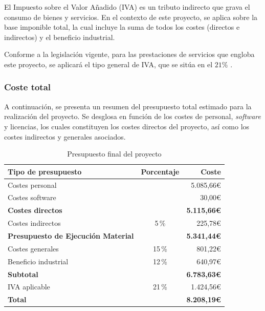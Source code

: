 \documentclass[12pt,a4paper,onecolumn,oneside]{report}
\begin{document}
El Impuesto sobre el Valor Añadido (IVA) es un tributo indirecto que grava el consumo de bienes y servicios. 
En el contexto de este proyecto, se aplica sobre la base imponible total, la cual incluye la suma de todos los costes (directos e indirectos) y el beneficio industrial.

Conforme a la legislación vigente, para las prestaciones de servicios que engloba este proyecto, se aplicará el tipo general de IVA, que se sitúa en el $21\%$ \cite{AEAT_IVA2025}.

\subsubsection{Coste total}
A continuación, se presenta un resumen del presupuesto total estimado para la realización del proyecto. 
Se desglosa en función de los costes de personal, \textit{software} y licencias, los cuales constituyen
los costes directos del proyecto, así como los costes indirectos y generales asociados.

\begin{table}[H]
\caption{Presupuesto final del proyecto}
\centering
\renewcommand{\arraystretch}{1.25}
\begin{tabular}{lcr}
\hline
\textbf{Tipo de presupuesto} & \textbf{Porcentaje} & \textbf{Coste} \\
\hline
Costes personal                 &          & 5.085,66\euro{} \\
Costes software                 &          & 30,00\euro{} \\
\hline
\textbf{Costes directos}       &          & \textbf{5.115,66\euro{}} \\
Costes indirectos     & 5\,\%    & 225,78\euro{} \\
\hline
\textbf{Presupuesto de Ejecución Material} &          & \textbf{5.341,44\euro{}} \\
Costes generales      &  15\,\%  & 801,22\euro{} \\
Beneficio industrial  & 12\,\%   & 640,97\euro{} \\
\hline
\textbf{Subtotal}     &          & \textbf{6.783,63\euro{}} \\
IVA aplicable         & 21\,\%   & 1.424,56\euro{} \\
\hline
\textbf{Total}        &          & \textbf{8.208,19\euro{}} \\
\hline
\end{tabular}
\label{tab:presupuesto_final}
\end{table}
\end{document}
